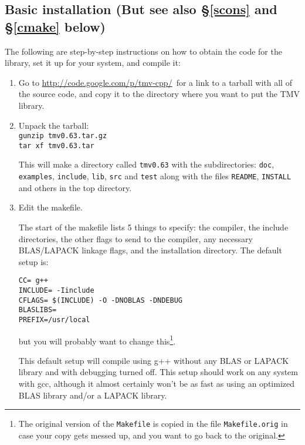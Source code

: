 \documentclass[twoside,letterpaper,11pt]{article}
\newcommand{\tmvversion}{0.63}
\newcommand{\websitex}{http://code.google.com/p/tmv-cpp/}
\newcommand{\website}{\url{\websitex}}
\renewcommand{\tt}[1]{{\lstinline {#1}}}
\begin{document}
\subsection[Basic installation]
{Basic installation \textnormal{(But see also \S\ref{scons} and \S\ref{cmake} below)}}
\label{install}
The following are step-by-step instructions on how to obtain the code for the library,
set it up for your system, and compile it:
\begin{enumerate}

\item
{}
Go to \website\ for a link to a tarball with all of the source code, and copy
it to the directory where you want to put the TMV library.

\item
Unpack the tarball:\\
\texttt{gunzip tmv\tmvversion .tar.gz}\\
\texttt{tar xf tmv\tmvversion .tar}

This will make a directory called \texttt{tmv\tmvversion} with the subdirectories:
\texttt{doc}, \texttt{examples}, \texttt{include}, \texttt{lib}, \texttt{src} and \texttt{test} 
along with the files \tt{README}, \tt{INSTALL} and others
in the top directory.

\item
Edit the makefile.

The start of the makefile lists 5 things to specify: the compiler,
the include directories, the other flags to send to the compiler, 
any necessary BLAS/LAPACK linkage flags, and the installation directory.
The default setup is:
\begin{verbatim}
CC= g++
INCLUDE= -Iinclude
CFLAGS= $(INCLUDE) -O -DNOBLAS -DNDEBUG
BLASLIBS=
PREFIX=/usr/local
\end{verbatim}
but you will probably want to change this\footnote{
The original version of the \texttt{Makefile}
is copied in the file \texttt{Makefile.orig} in case your copy gets messed up, and you want to 
go back to the original.}.

This default setup will compile using g++ without any BLAS or LAPACK library and 
with debugging turned off. 
This setup should work on any system with gcc, although it almost certainly 
won't be as fast as using an optimized BLAS library and/or a LAPACK library.


\end{enumerate}
\end{document}
